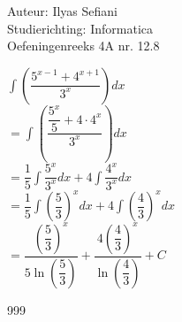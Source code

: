 \documentclass[a4paper]{article}
\begin{document}
\noindent \large Auteur: Ilyas Sefiani \\
\noindent \large Studierichting: Informatica\\
\noindent \large Oefeningenreeks 4A nr. 12.8\\

\medskip

\normalsize

$\displaystyle\int \left(\dfrac{5^{x-1}+4^{x+1}}{3^x}\right)dx$\\

$= \displaystyle\int \left(\dfrac{\dfrac{5^x}{5}+4\cdot4^x}{3^x}\right)dx$\\

$= \dfrac{1}{5}\displaystyle\int \dfrac{5^x}{3^x}dx+ 4\displaystyle\int \dfrac{4^x}{3^x}dx$\\

$= \dfrac{1}{5}\displaystyle\int \left(\dfrac{5}{3}\right)^xdx+ 4\displaystyle\int \left(\dfrac{4}{3}\right)^xdx$\\

$= \dfrac{\left(\dfrac{5}{3}\right)^x}{5\ln\left(\dfrac{5}{3}\right)} + \dfrac{4\left(\dfrac{4}{3}\right)^x}{\ln\left(\dfrac{4}{3}\right)} + C$\\

\begin{thebibliography}{999}
\end{thebibliography}
\end{document}

